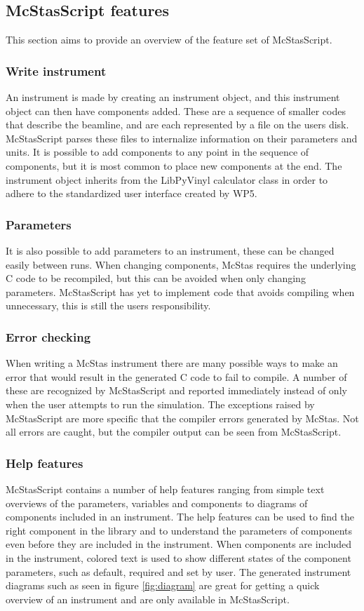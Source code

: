 \documentclass[11pt, a4paper]{article}
\begin{document}
\subsection{McStasScript features}
This section aims to provide an overview of the feature set of McStasScript.

\subsubsection{Write instrument}
An instrument is made by creating an instrument object, and this instrument object can then have components added. These are a sequence of smaller codes that describe the beamline, and are each represented by a file on the users disk. McStasScript parses these files to internalize information on their parameters and units. It is possible to add components to any point in the sequence of components, but it is most common to place new components at the end. The instrument object inherits from the LibPyVinyl calculator class in order to adhere to the standardized user interface created by WP5.

\subsubsection{Parameters}
It is also possible to add parameters to an instrument, these can be changed easily between runs. When changing components, McStas requires the underlying C code to be recompiled, but this can be avoided when only changing parameters. McStasScript has yet to implement code that avoids compiling when unnecessary, this is still the users responsibility.

\subsubsection{Error checking}
When writing a McStas instrument there are many possible ways to make an error that would result in the generated C code to fail to compile. A number of these are recognized by McStasScript and reported immediately instead of only when the user attempts to run the simulation. The exceptions raised by McStasScript are more specific that the compiler errors generated by McStas. Not all errors are caught, but the compiler output can be seen from McStasScript.

\subsubsection{Help features}
McStasScript contains a number of help features ranging from simple text overviews of the parameters, variables and components to diagrams of components included in an instrument. The help features can be used to find the right component in the library and to understand the parameters of components even before they are included in the instrument. When components are included in the instrument, colored text is used to show different states of the component parameters, such as default, required and set by user. The generated instrument diagrams such as seen in figure \ref{fig:diagram} are great for getting a quick overview of an instrument and are only available in McStasScript.
\end{document}
